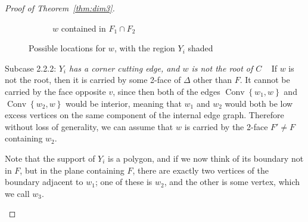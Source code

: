 \documentclass[ALCO,ThmDefs,Unicode,epreuves]{cedram}
\DeclareMathOperator{\Convop}{Conv}
\newcommand{\Conv}[1]{\Convop\left\{{#1}\right\}}
\newenvironment{proofsection}[2]{\begin{enonce*}[remark]{#1 \emph{#2}} \ }{\end{enonce*}}
\begin{document}
\begin{proof}[Proof of Theorem~\ref{thm:dim3}]
\begin{figure}[htb]
\begin{subfigure}{0.35\textwidth}
\caption{$w$ contained in $F_1\cap F_2$}
\label{subfig:w-on-edge}
\end{subfigure}
\hfill{}
\caption{Possible locations for $w$, with the region $Y_i$ shaded}
\label{fig:locations-for-w}
\end{figure}



\begin{proofsection}{Subcase 2.2.2:}{$Y_i$ has a corner cutting edge, and $w$ is not the root of $C$}
If $w$ is not the root, then it is carried by some 2-face of $\Delta$ other than $F$. It cannot be carried by the face opposite $v$, since then both of the edges $\Conv{w_1,w}$ and $\Conv{w_2,w}$ would be interior, meaning that $w_1$ and $w_2$ would both be low excess vertices on the same component of the internal edge graph. Therefore without loss of generality, we can assume that $w$ is carried by the 2-face $F' \neq F$ containing $w_2$.

Note that the support of $Y_i$ is a polygon, and if we now think of its boundary not in $F$, but in the plane containing $F$, there are exactly two vertices of the boundary adjacent to $w_1$; one of these is $w_2$, and the other is some vertex, which we call $w_3$.


\end{proofsection}
\end{proof}
\end{document}
